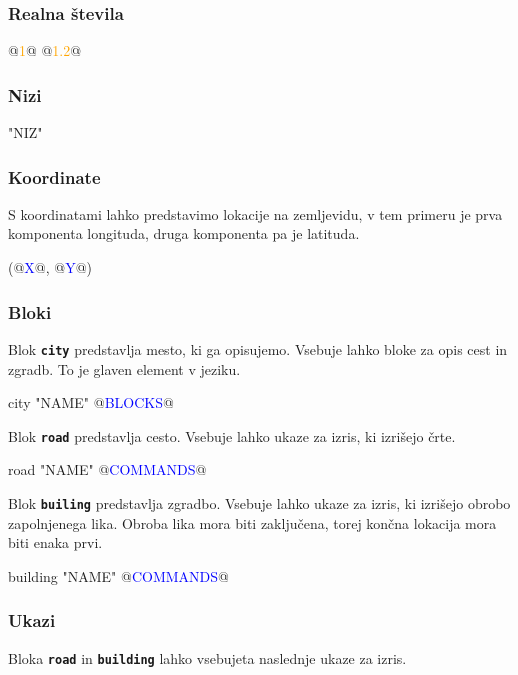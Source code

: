 \documentclass{article}
\newcommand\Var[1]{\textcolor{blue}{#1}}
\newcommand\Num[1]{\textcolor{orange}{#1}}
\newcommand\Keyword[1]{{\textbf{\texttt{#1}}}}
\begin{document}
\subsubsection{Realna števila}
\begin{CITY}
  @\Num{1}@
  @\Num{1.2}@
\end{CITY}

\subsubsection{Nizi}
\begin{CITY}
  "NIZ"
\end{CITY}

\subsubsection{Koordinate}
S koordinatami lahko predstavimo lokacije na zemljevidu, v tem primeru je prva komponenta longituda, druga komponenta pa je latituda.
\begin{CITY}
  (@\Var{X}@, @\Var{Y}@)
\end{CITY}

\subsubsection{Bloki}
Blok \Keyword{city} predstavlja mesto, ki ga opisujemo.
Vsebuje lahko bloke za opis cest in zgradb.
To je glaven element v jeziku.
\begin{CITY}
  city "NAME" {
    @\Var{BLOCKS}@
  }
\end{CITY}

Blok \Keyword{road} predstavlja cesto.
Vsebuje lahko ukaze za izris, ki izrišejo črte.
\begin{CITY}
  road "NAME" {
    @\Var{COMMANDS}@
  }
\end{CITY}

Blok \Keyword{builing} predstavlja zgradbo.
Vsebuje lahko ukaze za izris, ki izrišejo obrobo zapolnjenega lika.
Obroba lika mora biti zaključena, torej končna lokacija mora biti enaka prvi.
\begin{CITY}
  building "NAME" {
    @\Var{COMMANDS}@
  }
\end{CITY}

\subsubsection{Ukazi}

Bloka \Keyword{road} in \Keyword{building} lahko vsebujeta naslednje ukaze za izris.
\end{document}
